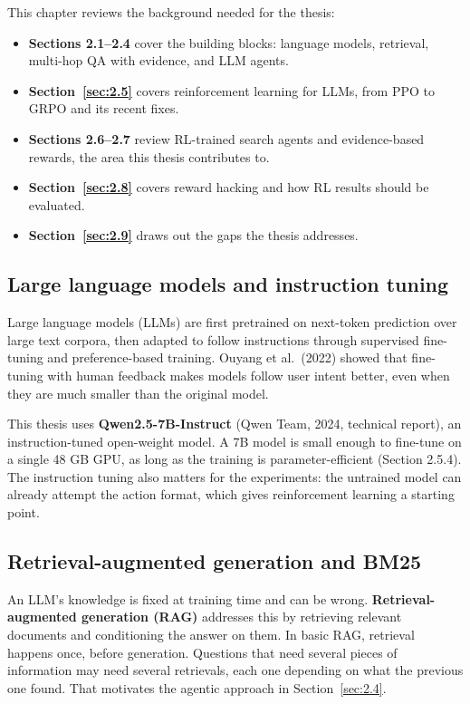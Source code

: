 
This chapter reviews the background needed for the thesis:

\begin{itemize}
\tightlist
\item
  \textbf{Sections 2.1--2.4} cover the building blocks: language models,
  retrieval, multi-hop QA with evidence, and LLM agents.
\item
  \textbf{Section~\ref{sec:2.5}} covers reinforcement learning for LLMs,
  from PPO to GRPO and its recent fixes.
\item
  \textbf{Sections 2.6--2.7} review RL-trained search agents and
  evidence-based rewards, the area this thesis contributes to.
\item
  \textbf{Section~\ref{sec:2.8}} covers reward hacking and how RL
  results should be evaluated.
\item
  \textbf{Section~\ref{sec:2.9}} draws out the gaps the thesis
  addresses.
\end{itemize}

\subsection{Large language models and instruction tuning}\label{sec:2.1}

Large language models (LLMs) are first pretrained on next-token
prediction over large text corpora, then adapted to follow instructions
through supervised fine-tuning and preference-based training. Ouyang et
al.~(2022) showed that fine-tuning with human feedback makes models
follow user intent better, even when they are much smaller than the
original model.

This thesis uses \textbf{Qwen2.5-7B-Instruct} (Qwen Team, 2024,
technical report), an instruction-tuned open-weight model. A 7B model is
small enough to fine-tune on a single 48 GB GPU, as long as the training
is parameter-efficient (Section 2.5.4). The instruction tuning also
matters for the experiments: the untrained model can already attempt the
action format, which gives reinforcement learning a starting point.

\subsection{Retrieval-augmented generation and BM25}\label{sec:2.2}

An LLM's knowledge is fixed at training time and can be wrong.
\textbf{Retrieval-augmented generation (RAG)} addresses this by
retrieving relevant documents and conditioning the answer on them. In
basic RAG, retrieval happens once, before generation. Questions that
need several pieces of information may need several retrievals, each one
depending on what the previous one found. That motivates the agentic
approach in Section~\ref{sec:2.4}.

